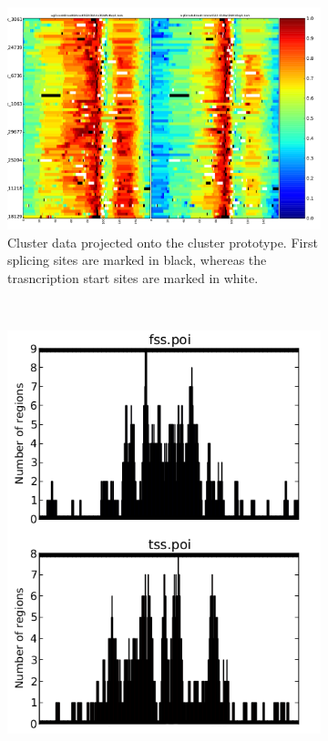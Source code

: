 \documentclass[parskip]{cs4rep}
\begin{document}
\begin{figure}
\begin{subfigure}[b]{0.8\textwidth}
        \includegraphics[width=\textwidth]{figures/evaluation/macs-peaks/dgw-cluster-35-warped-heatmap.pdf}
        \caption{Cluster data projected onto the cluster prototype. First splicing sites are marked in black, whereas the trasncription start sites are marked in white.}
        \label{fig:evaluation:macs-peaks:warped-heatmap}
    \end{subfigure}
    ~
    \begin{subfigure}[b]{0.3\textwidth}
        \centering
        \includegraphics[width=\textwidth]{figures/evaluation/macs-peaks/cluster-35-histogram-clean.png}

\end{subfigure}
\end{figure}
\end{document}
